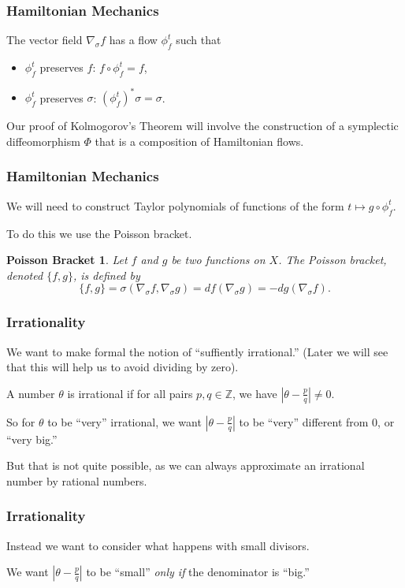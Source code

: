 \documentclass{beamer}
\newcommand{\Z}{\mathbb{Z}}
\newcommand{\sgrad}{\nabla_{\sigma}}
\begin{document}
\begin{frame}
  \frametitle{Hamiltonian Mechanics}
  The vector field $\sgrad f$ has a flow $\phi^t_f$ such that
  \begin{itemize}
  \item $\phi^t_f$ preserves $f$: $f \circ \phi^t_f = f$,
  \item $\phi^t_f$ preserves $\sigma$: $(\phi^t_f)^* \sigma = \sigma$.
  \end{itemize}

  Our proof of Kolmogorov's Theorem will involve the construction of a
  symplectic diffeomorphism $\Phi$ that is a composition of Hamiltonian flows.
\end{frame}

\begin{frame}
  \frametitle{Hamiltonian Mechanics}
  We will need to construct Taylor polynomials of functions of the form $t
  \mapsto g \circ \phi^t_f$.

  To do this we use the Poisson bracket.
  \newtheorem{possbrack}{Poisson Bracket}
  \begin{possbrack}
    Let $f$ and $g$ be two functions on $X$.
    The \emph{Poisson bracket}, denoted $\{f, g\}$, is defined by
    \begin{equation*}
      \{f, g\} = \sigma(\sgrad f, \sgrad g) = df(\sgrad g) = - dg(\sgrad f).
    \end{equation*}
  \end{possbrack}
\end{frame}

\begin{frame}
  \frametitle{Irrationality}
  We want to make formal the notion of ``suffiently irrational.''
  (Later we will see that this will help us to avoid dividing by zero).  

  A number $\theta$ is irrational if for all pairs $p, q \in \Z$, we have
  $\left|\theta - \frac{p}{q}\right| \neq 0$.

  So for $\theta$ to be ``very'' irrational, we want $\left|\theta -
    \frac{p}{q}\right|$ to be ``very'' different from $0$, or ``very big.''

  But that is not quite possible, as we can always approximate an irrational
  number by rational numbers.
\end{frame}

\begin{frame}
  \frametitle{Irrationality}
  Instead we want to consider what happens with small divisors.

  We want $\left| \theta - \frac{p}{q} \right|$ to be ``small'' \emph{only if}
  the denominator is ``big.''
\end{frame}
\end{document}

